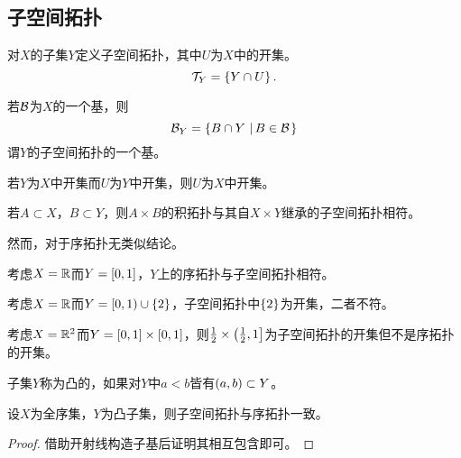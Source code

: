 \documentclass{ctexrep}
\begin{document}
  \subsection{子空间拓扑}
  \begin{definition}
  对$X$的子集$Y$定义子空间拓扑，其中$U$为$X$中的开集。
  \[ \mathcal{T}_Y = \left\{Y\cap U\right\}. \]
  \end{definition}
  \begin{theorem}
  若$\mathcal{B}$为$X$的一个基，则
  \[ \mathcal{B}_Y = \left\{B\cap Y \, \left| \, B \in \mathcal{B} \right.\right\} \]
  谓$Y$的子空间拓扑的一个基。
  \end{theorem}
  \begin{lemma}
  若$Y$为$X$中开集而$U$为$Y$中开集，则$U$为$X$中开集。
  \end{lemma}
  \begin{theorem}
  若$A\subset X$，$B\subset Y$，则$A\times B$的积拓扑与其自$X\times Y$继承的子空间拓扑相符。
  \end{theorem}
  然而，对于序拓扑无类似结论。
  \begin{ex}
  考虑$X=\mathbb{R}$而$Y=\left[0,1\right]$，$Y$上的序拓扑与子空间拓扑相符。
  \end{ex}
  \begin{ex}
  考虑$X=\mathbb{R}$而$Y=\left[0,1\right)\cup\left\{2\right\}$，子空间拓扑中$\left\{2\right\}$为开集，二者不符。
  \end{ex}
  \begin{ex}
  考虑$X=\mathbb{R}^2$而$Y=\left[0,1\right]\times\left[0,1\right]$，则$\frac{1}{2}\times\left(\frac{1}{2},1\right]$为子空间拓扑的开集但不是序拓扑的开集。
  \end{ex}
  \begin{definition}
  子集$Y$称为凸的，如果对$Y$中$a<b$皆有$\left(a,b\right)\subset Y$。
  \end{definition}
  \begin{theorem}
  设$X$为全序集，$Y$为凸子集，则子空间拓扑与序拓扑一致。
  \end{theorem}
  \begin{proof}
  借助开射线构造子基后证明其相互包含即可。
  \end{proof}
\end{document}
